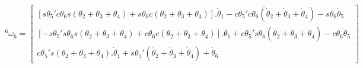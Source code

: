 \begin{equation}
\begin{gathered}
    ^6\omega_6 = \begin{bmatrix}
        [s\theta_5'c\theta_6s(\theta_2+\theta_3+\theta_4) + s\theta_6c(\theta_2+\theta_3+\theta_4)].\dot{\theta}_1 - c\theta_5'c\theta_6(\dot{\theta}_2 + \dot{\theta}_3 + \dot{\theta}_4) - s\theta_6\dot{\theta}_5 \\
        [-s\theta_5's\theta_6s(\theta_2+\theta_3+\theta_4) + c\theta_6c(\theta_2+\theta_3+\theta_4)].\dot{\theta}_1 + c\theta_5's\theta_6(\dot{\theta}_2 + \dot{\theta}_3 + \dot{\theta}_4) - c\theta_6\dot{\theta}_5 \\ 
        c\theta_5's(\theta_2+\theta_3+\theta_4).\dot{\theta}_1 + s\theta_5'(\dot{\theta}_2 + \dot{\theta}_3 + \dot{\theta}_4) + \dot{\theta}_6
    \end{bmatrix}
\end{gathered}
\end{equation}

